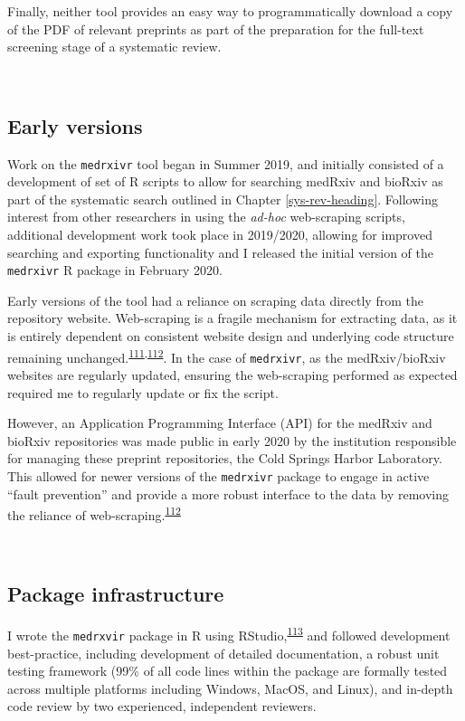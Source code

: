 \documentclass[a4paper, twoside]{templates/ociamthesis}
\begin{document}
Finally, neither tool provides an easy way to programmatically download a copy of the PDF of relevant preprints as part of the preparation for the full-text screening stage of a systematic review.

~

\hypertarget{early-versions}{%
\subsection{Early versions}\label{early-versions}}

Work on the \texttt{medrxivr} tool began in Summer 2019, and initially consisted of a development of set of R scripts to allow for searching medRxiv and bioRxiv as part of the systematic search outlined in Chapter \ref{sys-rev-heading}. Following interest from other researchers in using the \emph{ad-hoc} web-scraping scripts, additional development work took place in 2019/2020, allowing for improved searching and exporting functionality and I released the initial version of the \texttt{medrxivr} R package in February 2020.

Early versions of the tool had a reliance on scraping data directly from the repository website. Web-scraping is a fragile mechanism for extracting data, as it is entirely dependent on consistent website design and underlying code structure remaining unchanged.\textsuperscript{\protect\hyperlink{ref-shaw2002}{111},\protect\hyperlink{ref-laprie1992}{112}}. In the case of \texttt{medrxivr}, as the medRxiv/bioRxiv websites are regularly updated, ensuring the web-scraping performed as expected required me to regularly update or fix the script.

However, an Application Programming Interface (API) for the medRxiv and bioRxiv repositories was made public in early 2020 by the institution responsible for managing these preprint repositories, the Cold Springs Harbor Laboratory. This allowed for newer versions of the \texttt{medrxivr} package to engage in active ``fault prevention'' and provide a more robust interface to the data by removing the reliance of web-scraping.\textsuperscript{\protect\hyperlink{ref-laprie1992}{112}}

~

\hypertarget{package-infrastructure}{%
\subsection{Package infrastructure}\label{package-infrastructure}}

I wrote the \texttt{medrxvir} package in R using RStudio,\textsuperscript{\protect\hyperlink{ref-rcoreteam2019}{113}} and followed development best-practice, including development of detailed documentation, a robust unit testing framework (99\% of all code lines within the package are formally tested across multiple platforms including Windows, MacOS, and Linux), and in-depth code review by two experienced, independent reviewers.
\end{document}
